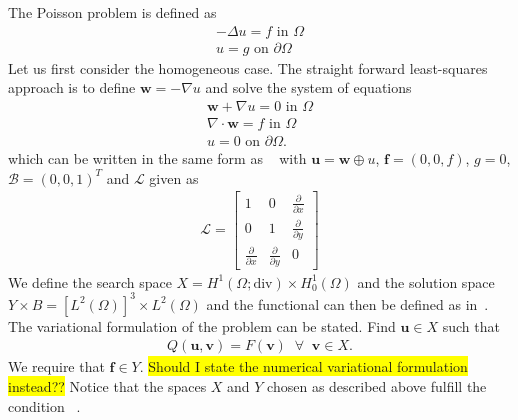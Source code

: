 The Poisson problem is defined as 
\begin{align}
	-\Delta u = f \text{ in } \Omega \\
	u = g \text{ on } \partial \Omega
	\label{eq:Poisson}
\end{align}
Let us first consider the homogeneous case. The straight forward least-squares approach is to define $\mathbf{w} = -\nabla u$ and solve the system of equations 
\begin{align}
	\mathbf{w} + \nabla u = 0 \text{ in } \Omega \\
	\nabla \cdot \mathbf{w} = f \text{ in } \Omega \\
	u = 0 \text{ on } \partial \Omega.
	\label{eq:PoissonSystem}
\end{align}
which can be written in the same form as ~ with $ \mathbf{u} = \mathbf{w} \oplus u $, $\mathbf{f} = (0,0,f)$, $g=0$, $\mathcal{B} = (0,0,1)^T $ and $\mathcal{L}$ given as 
\begin{align}
	\mathcal{L} =
	\begin{bmatrix}
		1 & 0 & \frac{\partial} {\partial x}  \\
		0 & 1 & \frac{\partial} {\partial y}  \\
    \frac{\partial} {\partial x} & \frac{\partial} {\partial y} & 0 
	\end{bmatrix}
	\label{eq:Amatrix}
\end{align}
We define the search space $X =  H^1(\Omega;\text{div}) \times H_0^1(\Omega)$ and the solution space $Y \times B  = [L^2(\Omega)]^3\times L^2(\Omega) $ and the functional can then be defined as in~. The variational formulation of the problem can be stated. Find $ \mathbf{u} \in X $ such that
\begin{align}
	Q(\mathbf{u},\mathbf{v}) = F(\mathbf{v}) \;\; \forall \;\; \mathbf{v} \in X.
	\label{eq:VariationalFormulationPoisson}
\end{align}
We require that $\mathbf{f} \in Y$.
\colorbox{yellow}{Should I state the numerical variational formulation instead??}
Notice that the spaces $X$ and $Y$ chosen as described above fulfill the condition ~. 
%
